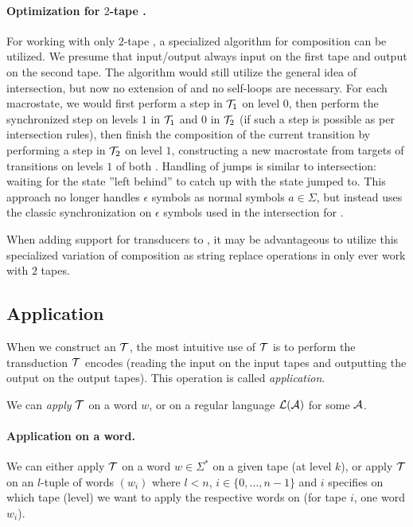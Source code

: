 \paragraph{Optimization for $2$-tape \nfts.}
For working with only $2$-tape \nfts, a specialized algorithm for composition can be utilized.
We presume that input/output \nfts always input on the first tape and output on the second tape.
The algorithm would still utilize the general idea of \nft intersection, but now no extension of \nfts and no self-loops are necessary.
For each macrostate, we would first perform a step in $\mathcal{T}_1$ on level $0$, then perform the synchronized step on levels $1$ in $\mathcal{T}_1$ and $0$ in $\mathcal{T}_2$ (if such a step is possible as per \nft intersection rules), then finish the composition of the current transition by performing a step in $\mathcal{T}_2$ on level $1$, constructing a new macrostate from targets of transitions on levels $1$ of both \nfts.
Handling of jumps is similar to \nft intersection: waiting for the state ''left behind'' to catch up with the state jumped to.
This approach no longer handles $\epsilon$ symbols as normal symbols $a \in \Sigma$, but instead uses the classic synchronization on $\epsilon$ symbols used in the intersection for \nfas.

When adding support for transducers to \noodler, it may be advantageous to utilize this specialized variation of composition as string replace operations in \noodler only ever work with $2$ tapes.

\subsection{Application}

When we construct an \nft $\mathcal{T}$, the most intuitive use of $\mathcal{T}$ is to perform the transduction $\mathcal{T}$ encodes (reading the input on the input tapes and outputting the output on the output tapes).
This operation is called \emph{application}.

We can \emph{apply} $\mathcal{T}$ on a word $w$, or on a regular language $\mathcal{L}(\mathcal{A})$ for some $\mathcal{A}$.

\paragraph{Application on a word.}
We can either apply $\mathcal{T}$ on a word $w \in \Sigma^*$ on a given tape (at level $k$), or apply $\mathcal{T}$ on an $l$-tuple of words $(w_i)$ where $l < n$, $i \in \{ 0, \ldots, n - 1 \}$ and $i$ specifies on which tape (level) we want to apply the respective words on (for tape $i$, one word $w_i$).

